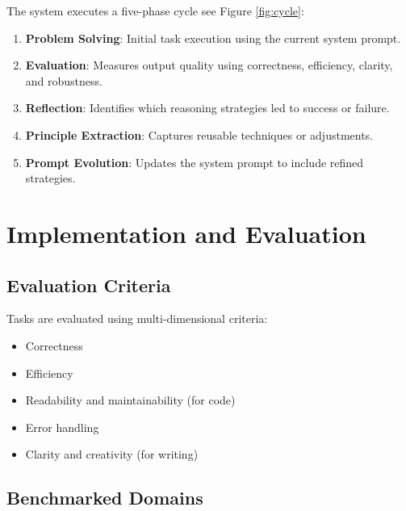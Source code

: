 \documentclass[10pt,a4paper,twocolumn]{article}
\begin{document}
 The system executes a five-phase cycle see Figure \ref{fig:cycle}:

\begin{enumerate}
    \item \textbf{Problem Solving}: Initial task execution using the current system prompt.
    \item \textbf{Evaluation}: Measures output quality using correctness, efficiency, clarity, and robustness.
    \item \textbf{Reflection}: Identifies which reasoning strategies led to success or failure.
    \item \textbf{Principle Extraction}: Captures reusable techniques or adjustments.
    \item \textbf{Prompt Evolution}: Updates the system prompt to include refined strategies.
\end{enumerate}





\section{{Implementation and Evaluation} }





\subsection{Evaluation Criteria}


 Tasks are evaluated using multi-dimensional criteria:

\begin{itemize}
    \item Correctness
    \item Efficiency
    \item Readability and maintainability (for code)
    \item Error handling
    \item Clarity and creativity (for writing)



\end{itemize}



\subsection{Benchmarked Domains}
\end{document}
